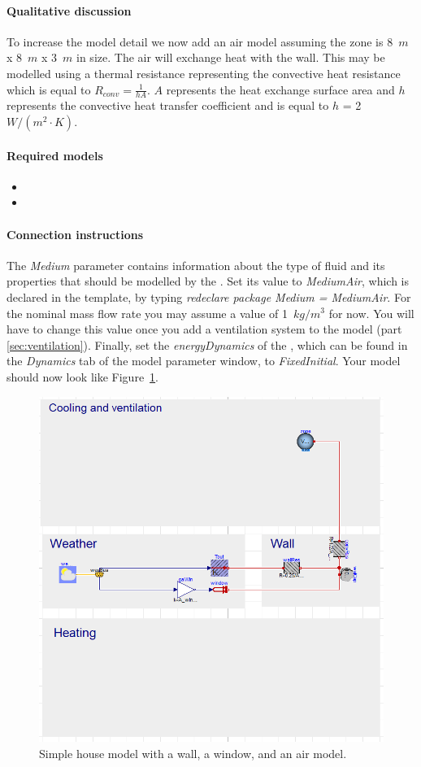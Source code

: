 \documentclass[10pt,a4paper]{article}
\begin{document}
\paragraph{Qualitative discussion}
To increase the model detail we now add an air model assuming the zone is 8~$m$ x 8~$m$ x 3~$m$ in size. The air will exchange heat with the wall. This may be modelled using a thermal resistance representing the convective heat resistance which is equal to $R_{conv}=\frac{1}{hA}$. $A$ represents the heat exchange surface area and $h$ represents the convective heat transfer coefficient and is equal to $h$ = 2~${W/(m^2\cdot K)}$.

\paragraph{Required models}
\begin{itemize}
\item {}
\item {}
\end{itemize}

\paragraph{Connection instructions}
The  \textit{Medium} parameter contains information about the type of fluid and its properties that should be modelled by the . Set its value to \textit{MediumAir}, which is declared in the template, by typing \textit{redeclare package Medium = MediumAir}. For the nominal mass flow rate you may assume a value of 1~$kg/m^3$ for now. You will have to change this value once you add a ventilation system to the model (part \ref{sec:ventilation}). Finally, set the \textit{energyDynamics} of the , which can be found in the \textit{Dynamics} tab of the model parameter window, to \textit{FixedInitial}. Your model should now look like Figure~\ref{fig:airModel}.
\begin{figure}[h]
\centering
\includegraphics[width=0.45\columnwidth]{img/airModel.png}
\caption{Simple house model with a wall, a window, and an air model.}
\label{fig:airModel}
\end{figure} 
\end{document}
